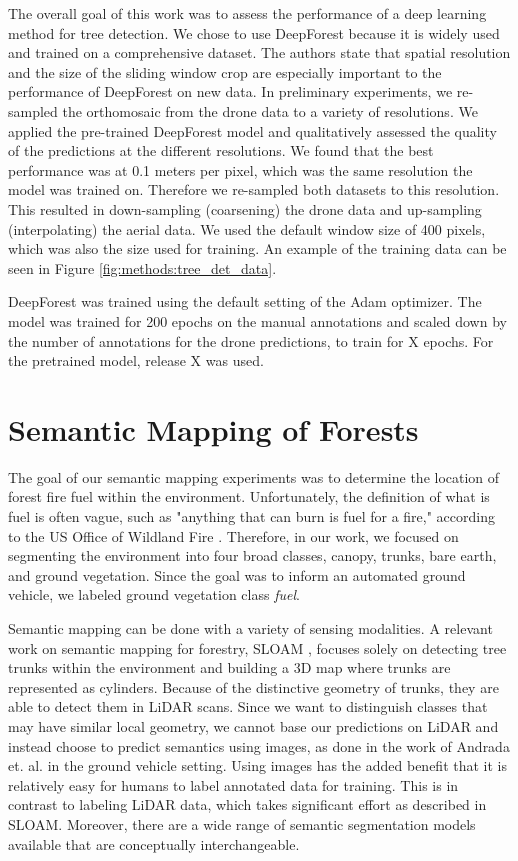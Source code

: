 The overall goal of this work was to assess the performance of a deep learning method for tree detection. We chose to use DeepForest \cite{Weinstein2020DeepForest:Delineation} because it is widely used and trained on a comprehensive dataset.
The authors state that spatial resolution and the size of the sliding window crop are especially important to the performance of DeepForest on new data. In preliminary experiments, we re-sampled the orthomosaic from the drone data to a variety of resolutions. We applied the pre-trained DeepForest model and qualitatively assessed the quality of the predictions at the different resolutions. We found that the best performance was at 0.1 meters per pixel, which was the same resolution the model was trained on. Therefore we re-sampled both datasets to this resolution. This resulted in down-sampling (coarsening) the drone data and up-sampling (interpolating) the aerial data. We used the default window size of 400 pixels, which was also the size used for training. An example of the training data can be seen in Figure \ref{fig:methods:tree_det_data}.

DeepForest was trained using the default setting of the Adam \cite{} optimizer. The model was trained for 200 epochs on the manual annotations and scaled down by the number of annotations for the drone predictions, to train for X epochs. For the pretrained model, release X was used.


\section{Semantic Mapping of Forests}
\label{sec:methods:sem_mapping}
The goal of our semantic mapping experiments was to determine the location of forest fire fuel within the environment. Unfortunately, the definition of what is fuel is often vague, such as "anything that can burn is fuel for a fire," according to the US Office of Wildland Fire \cite{Fire2021FuelsManagement}. Therefore, in our work, we focused on segmenting the environment into four broad classes, canopy, trunks, bare earth, and ground vegetation. Since the goal was to inform an automated ground vehicle, we labeled ground vegetation class \textit{fuel}.

Semantic mapping can be done with a variety of sensing modalities. A relevant work on semantic mapping for forestry, SLOAM \cite{Chen2020SLOAM:Inventory}, focuses solely on detecting tree trunks within the environment and building a 3D map where trunks are represented as cylinders. Because of the distinctive geometry of trunks, they are able to detect them in LiDAR scans. Since we want to distinguish classes that may have similar local geometry, we cannot base our predictions on LiDAR and instead choose to predict semantics using images, as done in the work of Andrada et. al. \cite{Andrada2020} in the ground vehicle setting. Using images has the added benefit that it is relatively easy for humans to label annotated data for training. This is in contrast to labeling LiDAR data, which takes significant effort as described in SLOAM. Moreover, there are a wide range of semantic segmentation models available that are conceptually interchangeable. 

